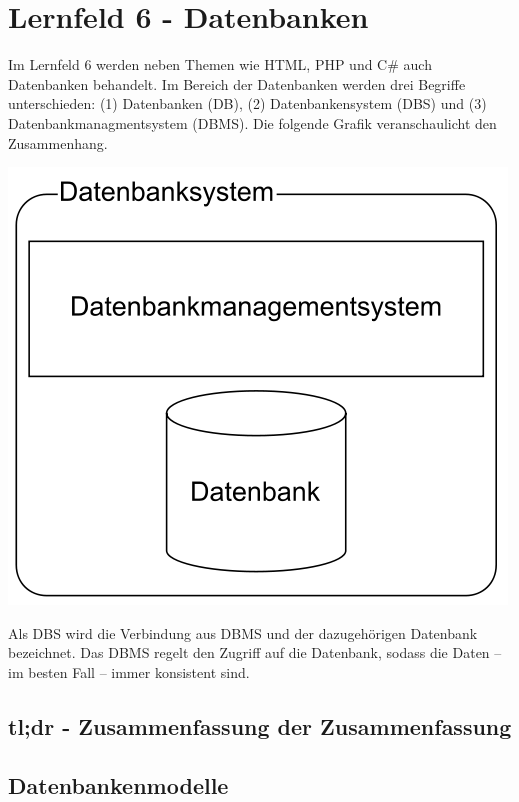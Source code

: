 \section{Lernfeld 6 - Datenbanken}

Im Lernfeld 6 werden neben Themen wie HTML, PHP und C\# auch Datenbanken behandelt. Im Bereich der Datenbanken werden drei Begriffe unterschieden: (1) Datenbanken (DB), (2) Datenbankensystem (DBS) und (3) Datenbankmanagmentsystem (DBMS). Die folgende Grafik veranschaulicht den Zusammenhang.

\includegraphics[scale=0.4]{1jahr_pictures/lf06db-pic/lf06db-begriffszusammenhang.png}

Als DBS wird die Verbindung aus DBMS und der dazugehörigen Datenbank bezeichnet. Das DBMS regelt den Zugriff auf die Datenbank, sodass die Daten -- im besten Fall -- immer konsistent sind. 

\subsection{tl;dr - Zusammenfassung der Zusammenfassung}


\subsection{Datenbankenmodelle}

